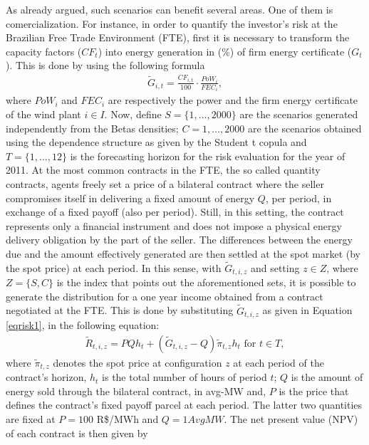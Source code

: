 \documentclass[a4paper]{IEEEtran}
\begin{document}
As already argued, such scenarios can benefit several areas. One of them is comercialization. For instance, in order to quantify the investor's risk at the Brazilian Free Trade Environment (FTE), first it is necessary to transform the capacity factors ($CF_{t}$) into energy generation in (\%) of firm energy certificate (${G}_{t}$). This is done by using the following formula
\begin{eqnarray}
\tilde{G}_{i,t}=\frac{CF_{i,t}}{100}\cdot \frac{PoW_{i}}{FEC_{i}}, \label{eqrisk1}
\end{eqnarray}
\noindent
where $PoW_{i}$ and $FEC_{i}$ are respectively the power and the firm energy certificate of the wind plant $i\in I$. Now, define $S=\lbrace 1,\ldots ,2000\rbrace $ are the scenarios generated independently from the Betas densities; $C={1,\ldots ,2000}$ are the scenarios obtained using the dependence structure as given by the Student t copula and $T=\lbrace 1,\ldots ,12\rbrace $ is the forecasting horizon for the risk evaluation for the year of 2011. At the most common contracts in the FTE, the so called quantity contracts, agents freely set a price of a bilateral contract where the seller compromises itself in delivering a fixed amount of energy $Q$, per period, in exchange of a fixed payoff (also per period). Still, in this setting, the contract represents only a financial instrument and does not impose a physical energy delivery obligation by the part of the seller. The differences between the energy due and the amount effectively generated are then settled at the spot market (by the spot price) at each period. In this sense, with $\tilde{G}_{t,i,z}$ and setting $z\in Z$, where $Z=\{S,C\}$ is the index that points out the aforementioned sets, it is possible to generate the distribution for a one year income obtained from a contract negotiated at the FTE. This is done by substituting $\tilde{G}_{t,i,z}$ as given in Equation \eqref{eqrisk1}, in the following equation: 
\begin{eqnarray}
\tilde{R}_{t,i,z}=PQh_{t}+(\tilde{G}_{t,i,z}-Q) \tilde{\pi}_{t,z}h_{t}\,\, \mbox{for}\,\, t \in T, \label{eqrisk2}
\end{eqnarray}
\noindent
where $\tilde{\pi}_{t,z}$ denotes the spot price at configuration $z$ at each period of the contract's horizon, $h_{t}$ is the total number of hours of period $t$; $Q$ is the amount of energy sold through the bilateral contract, in avg-MW and, $P$ is the price that defines the contract's fixed payoff parcel at each period. The latter two quantities are fixed at $P=100$ R\$/MWh and $Q=1AvgMW$. The net present value (NPV) of each contract is then given by 
\end{document}
